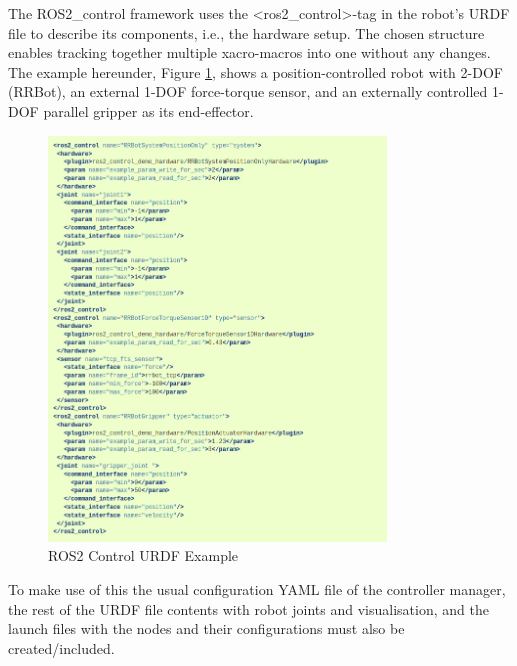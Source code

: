 \documentclass[10pt,a4paper,english]{article}
\begin{document}
The ROS2\_control framework uses the <ros2\_control>-tag in the robot's URDF file to describe its components, i.e., the hardware setup. The chosen structure enables tracking together multiple xacro-macros into one without any changes. The example hereunder, Figure \ref{fig:ros2_control_urdf}, shows a position-controlled robot with 2-DOF (RRBot), an external 1-DOF force-torque sensor, and an externally controlled 1-DOF parallel gripper as its end-effector.
\begin{figure}[ht]
    \centering
    \includegraphics[width=0.8\textwidth]{ROS2_Control_URDF.png}
    \caption{ROS2 Control URDF Example}
    \label{fig:ros2_control_urdf}
\end{figure} \clearpage
To make use of this the usual configuration YAML file of the controller manager, the rest of the URDF file contents with robot joints and visualisation, and the launch files with the nodes and their configurations must also be created/included.
\end{document}
